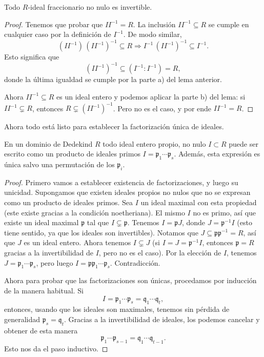 \begin{lema}
  Todo $R$-ideal fraccionario no nulo es invertible.

  \begin{proof}
    Tenemos que probar que $I I^{-1} = R$. La inclusión
    $I I^{-1} \subseteq R$ se cumple en cualquier caso por la definición
    de $I^{-1}$. De modo similar,
    \[ (I I^{-1})\,(I I^{-1})^{-1} \subseteq R \Longrightarrow
           I^{-1}\,(I I^{-1})^{-1} \subseteq I^{-1}. \]
    Esto significa que
    $$(I I^{-1})^{-1} \subseteq (I^{-1} : I^{-1}) = R,$$
    donde la última igualdad se cumple por la parte a) del lema anterior.

    Ahora $I I^{-1} \subseteq R$ es un ideal entero y podemos aplicar la parte
    b) del lema: si $I I^{-1} \subsetneq R$, entonces
    $R \subsetneq (I I^{-1})^{-1}$. Pero no es el caso, y por ende $I I^{-1} = R$.
  \end{proof}
\end{lema}

Ahora todo está listo para establecer la factorización única de ideales.

\begin{teorema}
  En un dominio de Dedekind $R$ todo ideal entero propio, no nulo $I \subset R$
  puede ser escrito como un producto de ideales primos
  $I = \mathfrak{p}_1\cdots\mathfrak{p}_s$. Además, esta expresión es única
  salvo una permutación de los $\mathfrak{p}_i$.

  \begin{proof}
    Primero vamos a establecer existencia de factorizaciones, y luego su
    unicidad. Supongamos que existen ideales propios no nulos que no se expresan
    como un producto de ideales primos. Sea $I$ un ideal maximal con esta
    propiedad (este existe gracias a la condición noetheriana). El mismo $I$
    no es primo, así que existe un ideal maximal $\mathfrak{p}$ tal que
    $I \subsetneq \mathfrak{p}$. Tenemos $I = \mathfrak{p} J$, donde
    $J = \mathfrak{p}^{-1} I$ (esto tiene sentido, ya que los ideales son
    invertibles). Notamos que $J \subseteq \mathfrak{p} \mathfrak{p}^{-1} = R$,
    así que $J$ es un ideal entero. Ahora tenemos $I \subsetneq J$
    (si $I = J = \mathfrak{p}^{-1} I$, entonces $\mathfrak{p} = R$
    gracias a la invertibilidad de $I$, pero no es el caso). Por la elección
    de $I$, tenemos $J = \mathfrak{p}_1\cdots\mathfrak{p}_s$, pero luego
    $I = \mathfrak{p}\mathfrak{p}_1\cdots\mathfrak{p}_s$. Contradicción.

    Ahora para probar que las factorizaciones son únicas, procedamos por
    inducción de la manera habitual. Si
    \[ I = \mathfrak{p}_1\cdots\mathfrak{p}_s =
           \mathfrak{q}_1\cdots\mathfrak{q}_t, \]
    entonces, usando que los ideales son maximales, tenemos sin pérdida de
    generalidad $\mathfrak{p}_s = \mathfrak{q}_t$. Gracias a la invertibilidad
    de ideales, los podemos cancelar y obtener de esta manera
    \[ \mathfrak{p}_1\cdots\mathfrak{p}_{s-1} =
       \mathfrak{q}_1\cdots\mathfrak{q}_{t-1}. \]
    Esto nos da el paso inductivo.
  \end{proof}
\end{teorema}

